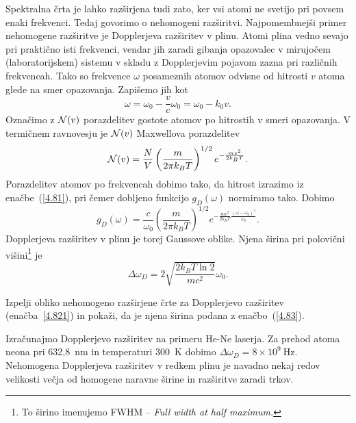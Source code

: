Spektralna črta je lahko razširjena tudi zato, ker vsi atomi ne svetijo
pri povsem enaki frekvenci. Tedaj govorimo o nehomogeni 
razširitvi.
Najpomembnejši primer nehomogene razširitve je Dopplerjeva 
 razširitev v plinu. 
Atomi plina vedno sevajo pri praktično isti frekvenci, vendar jih zaradi gibanja
opazovalec v mirujočem (laboratorijskem) sistemu v skladu z Dopplerjevim pojavom 
zazna pri različnih frekvencah. Tako so frekvence $\omega$ posameznih atomov 
odvisne od hitrosti $v$ atoma glede na smer opazovanja. Zapišemo jih kot  
\begin{equation}
\omega=\omega_{0}-\frac{v}{c}\omega_{0}=\omega_{0}-k_{0}v.
\label{4.81}
\end{equation}
Označimo z ${\cal N}(v)$ porazdelitev gostote atomov po hitrostih
v smeri opazovanja. V termičnem ravnovesju je ${\cal N}(v)$ Maxwellova
porazdelitev
\begin{equation}
{\cal N}(v)=\frac{N}{V}\left(\frac{m}{2\pi k_{B}T}\right)^{1/2}e^{-\frac{mv^{2}}{2k_{B}T}}.
\label{4.82}
\end{equation}
 Porazdelitev atomov po frekvencah dobimo tako, da hitrost izrazimo
iz enačbe~(\ref{4.81}), pri čemer dobljeno funkcijo $g_{D}(\omega)$
normiramo tako. Dobimo
\begin{equation}
g_{D}(\omega)=\frac{c}{\omega_{0}}\left(\frac{m}{2\pi 
k_{B}T}\right)^{1/2}e^{-\frac{mc^{2}}{2k_{B}T}\frac{(\omega-\omega_{0})^{2}}{\omega_{0}}}.
\label{4.821}
\end{equation}
Dopplerjeva razširitev v plinu je torej Gaussove oblike. Njena širina pri polovični 
višini\footnote{To širino imenujemo FWHM -- \it{Full width at half maximum}.} je
\begin{equation}
\Delta\omega_{D}=2 \sqrt{\frac{2k_{B}T \ln 2}{mc^{2}}}\omega_{0}.
\label{4.83}
\end{equation}
\begin{definition}
Izpelji obliko nehomogeno razširjene črte za Dopplerjevo razširitev (enačba~\ref{4.821})
in pokaži, da je njena širina podana z enačbo~(\ref{4.83}).
\end{definition}


Izračunajmo Dopplerjevo razširitev na primeru He-Ne laserja. Za prehod
atoma neona pri 632,8~nm in temperaturi 300~K dobimo 
$\Delta\omega_{D}=8\times10^{9}~\si{\hertz}$. Nehomogena Dopplerjeva razširitev v 
redkem plinu je navadno nekaj redov velikosti večja od homogene naravne širine in 
razširitve zaradi trkov.

